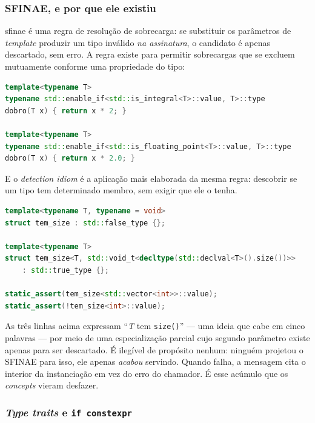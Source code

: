 \subsubsection{SFINAE, e por que ele existiu}

\gls{sfinae} é uma regra de resolução de sobrecarga: se substituir os parâmetros
de \emph{template} produzir um tipo inválido \emph{na assinatura}, o candidato é
apenas descartado, sem erro. A regra existe para permitir sobrecargas que se
excluem mutuamente conforme uma propriedade do tipo:

\begin{lstlisting}[style=bt, language=C++,
    caption={Duas sobrecargas mutuamente exclusivas, à moda pré-C++20.}]
template<typename T>
typename std::enable_if<std::is_integral<T>::value, T>::type
dobro(T x) { return x * 2; }

template<typename T>
typename std::enable_if<std::is_floating_point<T>::value, T>::type
dobro(T x) { return x * 2.0; }
\end{lstlisting}

E o \emph{detection idiom} é a aplicação mais elaborada da mesma regra: descobrir
se um tipo tem determinado membro, sem exigir que ele o tenha.

\begin{lstlisting}[style=bt, language=C++,
    caption={O \emph{detection idiom}: especialização parcial que só é válida se
             \texttt{.size()} existir.}]
template<typename T, typename = void>
struct tem_size : std::false_type {};

template<typename T>
struct tem_size<T, std::void_t<decltype(std::declval<T>().size())>>
    : std::true_type {};

static_assert(tem_size<std::vector<int>>::value);
static_assert(!tem_size<int>::value);
\end{lstlisting}

\begin{porque}
As três linhas acima expressam ``\emph{T} tem \texttt{size()}'' --- uma ideia que
cabe em cinco palavras --- por meio de uma especialização parcial cujo segundo
parâmetro existe apenas para ser descartado. É ilegível de propósito nenhum:
ninguém projetou o SFINAE para isso, ele apenas \emph{acabou} servindo. Quando
falha, a mensagem cita o interior da instanciação em vez do erro do chamador. É
esse acúmulo que os \emph{concepts} vieram desfazer.
\end{porque}

\subsubsection{\emph{Type traits} e \texttt{if constexpr}}

